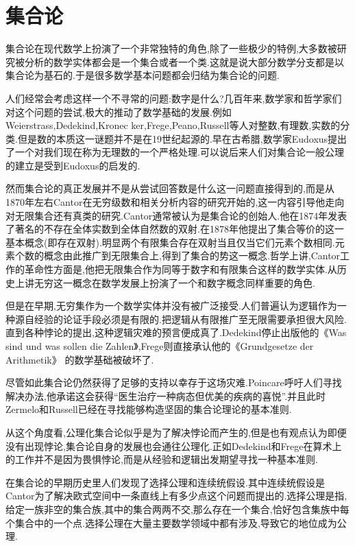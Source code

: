 \chapter{集合论}

集合论在现代数学上扮演了一个非常独特的角色,除了一些极少的特例,大多数被研究被分析的数学实体都会是一个集合或者一个类.这就是说大部分数学分支都是以集合论为基石的.于是很多数学基本问题都会归结为集合论的问题.

人们经常会考虑这样一个不寻常的问题:数字是什么?几百年来,数学家和哲学家们对这个问题的尝试,极大的推动了数学基础的发展.例如Weierstrass,Dedekind,Kronec\-
ker,Frege,Peano,Russell等人对整数,有理数,实数的分类.但是数的本质这一谜题并不是在19世纪起源的.早在古希腊,数学家Eudoxus提出了一个对我们现在称为无理数的一个严格处理.可以说后来人们对集合论一般公理的建立是受到Eudoxus的启发的.

然而集合论的真正发展并不是从尝试回答数是什么这一问题直接得到的,而是从1870年左右Cantor在无穷级数和相关分析内容的研究开始的,这一内容引导他走向对无限集合还有真类的研究.Cantor通常被认为是集合论的创始人.他在1874年发表了著名的不存在全体实数到全体自然数的双射.在1878年他提出了集合等价的这一基本概念(即存在双射).明显两个有限集合存在双射当且仅当它们元素个数相同.元素个数的概念由此推广到无限集合上,得到了集合的势这一概念.哲学上讲,Cantor工作的革命性方面是,他把无限集合作为同等于数字和有限集合这样的数学实体.从历史上讲无穷这一概念在数学发展上扮演了一个和数字概念同样重要的角色.

但是在早期,无穷集作为一个数学实体并没有被广泛接受.人们普遍认为逻辑作为一种源自经验的论证手段必须是有限的.把逻辑从有限推广至无限需要承担很大风险.直到各种悖论的提出,这种逻辑灾难的预言便成真了.Dedekind停止出版他的《Was sind und was sollen die Zahlen》,Frege则直接承认他的《Grundgesetze der Arithmetik》 的数学基础被破坏了.

尽管如此集合论仍然获得了足够的支持以幸存于这场灾难.Poincare呼吁人们寻找解决办法,他承诺这会获得“医生治疗一种病态但优美的疾病的喜悦”.并且此时Zermelo和Russell已经在寻找能够构造坚固的集合论理论的基本准则.

从这个角度看,公理化集合论似乎是为了解决悖论而产生的,但是也有观点认为即便没有出现悖论,集合论自身的发展也会通往公理化.正如Dedekind和Frege在算术上的工作并不是因为畏惧悖论,而是从经验和逻辑出发期望寻找一种基本准则.

在集合论的早期历史里人们发现了选择公理和连续统假设.其中连续统假设是Cantor为了解决欧式空间中一条直线上有多少点这个问题而提出的.选择公理是指,给定一族非空的集合族,其中的集合两两不交,那么存在一个集合,恰好包含集族中每个集合中的一个点.选择公理在大量主要数学领域中都有涉及,导致它的地位成为公理.

